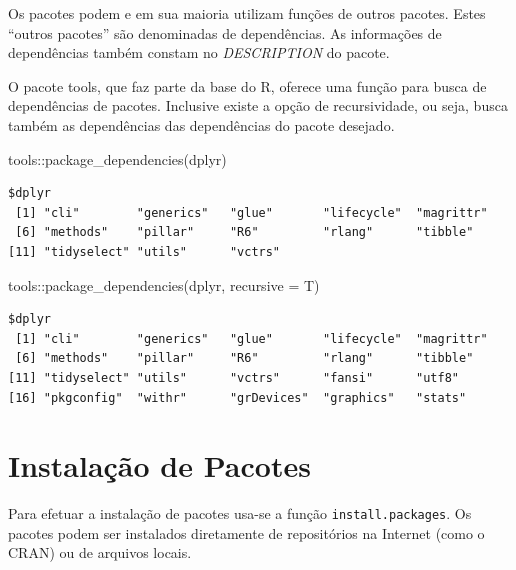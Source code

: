 \documentclass[
  letterpaper,
  DIV=11,
  numbers=noendperiod]{scrreprt}
\newenvironment{Shaded}{\begin{snugshade}}{\end{snugshade}}
\newcommand{\AttributeTok}[1]{\textcolor[rgb]{0.40,0.45,0.13}{#1}}
\newcommand{\FunctionTok}[1]{\textcolor[rgb]{0.28,0.35,0.67}{#1}}
\newcommand{\NormalTok}[1]{\textcolor[rgb]{0.00,0.23,0.31}{#1}}
\newcommand{\SpecialCharTok}[1]{\textcolor[rgb]{0.37,0.37,0.37}{#1}}
\newcommand{\StringTok}[1]{\textcolor[rgb]{0.13,0.47,0.30}{#1}}
\begin{document}
Os pacotes podem e em sua maioria utilizam funções de outros pacotes.
Estes ``outros pacotes'' são denominadas de dependências. As informações
de dependências também constam no \emph{DESCRIPTION} do pacote.

O pacote tools, que faz parte da base do R, oferece uma função para
busca de dependências de pacotes. Inclusive existe a opção de
recursividade, ou seja, busca também as dependências das dependências do
pacote desejado.

\begin{Shaded}
\begin{Highlighting}[]
\NormalTok{tools}\SpecialCharTok{::}\FunctionTok{package\_dependencies}\NormalTok{(}\StringTok{\textquotesingle{}dplyr\textquotesingle{}}\NormalTok{)}
\end{Highlighting}
\end{Shaded}

\begin{verbatim}
$dplyr
 [1] "cli"        "generics"   "glue"       "lifecycle"  "magrittr"  
 [6] "methods"    "pillar"     "R6"         "rlang"      "tibble"    
[11] "tidyselect" "utils"      "vctrs"     
\end{verbatim}

\begin{Shaded}
\begin{Highlighting}[]
\NormalTok{tools}\SpecialCharTok{::}\FunctionTok{package\_dependencies}\NormalTok{(}\StringTok{\textquotesingle{}dplyr\textquotesingle{}}\NormalTok{, }\AttributeTok{recursive =}\NormalTok{ T)}
\end{Highlighting}
\end{Shaded}

\begin{verbatim}
$dplyr
 [1] "cli"        "generics"   "glue"       "lifecycle"  "magrittr"  
 [6] "methods"    "pillar"     "R6"         "rlang"      "tibble"    
[11] "tidyselect" "utils"      "vctrs"      "fansi"      "utf8"      
[16] "pkgconfig"  "withr"      "grDevices"  "graphics"   "stats"     
\end{verbatim}

\hypertarget{instalauxe7uxe3o-de-pacotes}{%
\section{Instalação de Pacotes}\label{instalauxe7uxe3o-de-pacotes}}

Para efetuar a instalação de pacotes usa-se a função
\texttt{install.packages}. Os pacotes podem ser instalados diretamente
de repositórios na Internet (como o CRAN) ou de arquivos locais.
\end{document}
